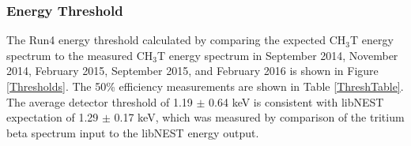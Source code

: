 \begin{figure} [!h]
\centering
{}
\qquad
{}
\label{BadKrypCalH3}
\end{figure}



\subsubsection{Energy Threshold}

The Run4 energy threshold calculated by comparing the expected CH$_3$T energy spectrum to the measured CH$_3$T energy spectrum in September 2014, November 2014, February 2015, September 2015, and February 2016 is shown in Figure \ref{Thresholds}. The 50\% efficiency measurements are shown in Table \ref{ThreshTable}.  The average detector threshold of 1.19 $\pm$ 0.64 keV is consistent with libNEST expectation of 1.29 $\pm$ 0.17 keV, which was measured by comparison of the tritium beta spectrum input to the libNEST energy output.

